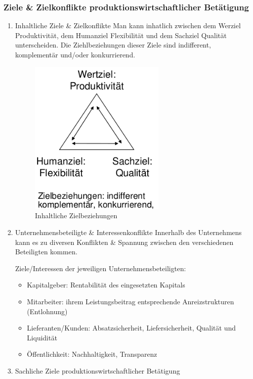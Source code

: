 \documentclass[11pt]{article}
\begin{document}
\subsubsection{Ziele \& Zielkonflikte produktionswirtschaftlicher Betätigung}
\label{sec:org137b27e}
\begin{enumerate}
\item Inhaltliche Ziele \& Zielkonflikte
\label{sec:org1b1d9d3}
Man kann inhatlich zwischen dem Werziel Produktivität, dem Humanziel Flexibilität und dem Sachziel Qualität unterscheiden. Die Ziehlbeziehungen dieser Ziele sind indifferent, komplementär und/oder konkurrierend.

\begin{figure}[htbp]
\centering
\includegraphics[width=250px]{./pictures/inhaltziele.png}
\caption{Inhaltliche Zielbeziehungen}
\end{figure} 

\item Unternehmensbeteiligte \& Interessenkonflikte
\label{sec:orgf518521}
Innerhalb des Unternehmens kann es zu diversen Konflikten \& Spannung zwischen den verschiedenen Beteiligten kommen.

Ziele/Interessen der jeweiligen Unternehmensbeteiligten:
\begin{itemize}
\item Kapitalgeber: Rentabilität des eingesetzten Kapitals
\item Mitarbeiter: ihrem Leistungsbeitrag entsprechende Anreizstrukturen (Entlohnung)
\item Lieferanten/Kunden: Absatzsicherheit, Liefersicherheit, Qualität und Liquidität
\item Öffentlichkeit: Nachhaltigkeit, Transparenz
\end{itemize}

\item Sachliche Ziele produktionswirtschaftlicher Betätigung
\label{sec:orge818be5}


\end{enumerate}
\end{document}
